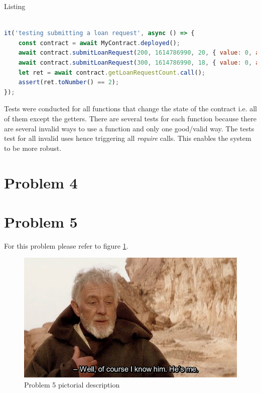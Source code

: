 \documentclass[a4paper, 12pt]{article}
\begin{document}
Listing 

\begin{lstlisting}[caption={Borrower submitting a load request}, basicstyle=\ttfamily, frame=single, language=JavaScript]
  
it('testing submitting a loan request', async () => {
	const contract = await MyContract.deployed();
	await contract.submitLoanRequest(200, 1614786990, 20, { value: 0, account: borrower });
	await contract.submitLoanRequest(300, 1614786990, 18, { value: 0, account: borrower });
	let ret = await contract.getLoanRequestCount.call();
	assert(ret.toNumber() == 2);
});

\end{lstlisting}

Tests were conducted for all functions that change the state of the contract i.e. all of them except the getters.
There are several tests for each function because there are several invalid ways to use a function and only one good/valid way. The tests test for all invalid uses hence triggering all \textit{require} calls. This enables the system to be more robust.

\section{Problem 4}

\section{Problem 5}
For this problem please refer to figure \ref{fig:obi}.

\begin{figure}[h!]
	\centering
	\includegraphics[width=\textwidth]{./Images/obi}
	\caption{Problem 5 pictorial description}
	\label{fig:obi}
\end{figure}

%
\end{document}
